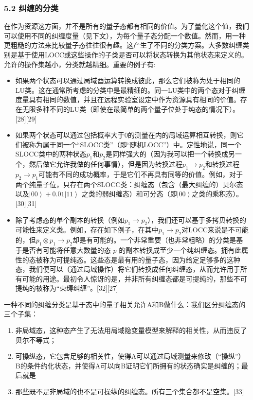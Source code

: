\subsubsection{5.2 纠缠的分类}
在作为资源这方面，并不是所有的量子态都有相同的价值。为了量化这个值，我们可以使用不同的纠缠度量（见下文），为每个量子态分配一个数值。然而，用一种更粗糙的方法来比较量子态往往很有趣。这产生了不同的分类方案。大多数纠缠类别是基于使用LOCC或这些操作的子类是否可以将状态转换为其他状态来定义的。允许的操作集越小，分类就越精细。重要的例子有:
\begin{itemize}
\item 如果两个状态可以通过局域酉运算转换成彼此，那么它们被称为处于相同的LU类。这在通常所考虑的分类中是最精细的。同一LU类中的两个态对于纠缠度量具有相同的数值，并且在远程实验室设定中作为资源具有相同的价值。存在无限多种不同的LU类（即使在最简单的两个量子位处于纯态的情况下）。[28][29]
\item 如果两个状态可以通过包括概率大于0的测量在内的局域运算相互转换，则它们被称为属于同一个“SLOCC类”（即“随机LOCC”）中。定性地说，同一个SLOCC类中的两种状态$p_{1}$和$p_{2}$是同样强大的（因为我可以把一个转换成另一个，然后做它允许我做的任何事情），但是因为转换过程$p_{1}\to p_{2}$和转换过程$p_{2}\to p_{1}$可能有不同的成功概率，于是它们不再具有同等的价值。例如，对于两个纯量子位，只存在两个SLOCC类：纠缠态（包含（最大纠缠的）贝尔态以及$\left|00\right\rangle + 0.01\left|11\right\rangle
 $ 之类的弱纠缠态）和可分态（即$\left|00\right\rangle$之类的乘积态）。[30][31]
\item 除了考虑态的单个副本的转换（例如$p_{1}\to p_{2}$），我们还可以基于多拷贝转换的可能性来定义类。例如，存在如下例子，在其中$p_{1}\to p_{2}$对LOCC来说是不可能的，但$p_{1}\otimes p_{1}\to p_{2}$却是有可能的。一个非常重要（也非常粗略）的分类是基于是否有可能将任意大数量的态 $p$ 的副本转换成至少一个纯纠缠态。拥有此属性的态被称为可提纯态。这些态是最有用的量子态，因为给定足够多的这种态，我们便可以（通过局域操作）将它们转换成任何纠缠态，从而允许用于所有可能的用途。最初令人惊讶的是，并非所有纠缠态都是可提纯的，那些不可提纯的被称为“束缚纠缠”。[32][27]
\end{itemize}

一种不同的纠缠分类是基于态中的量子相关允许A和B做什么：我们区分纠缠态的三个子集：
\begin{enumerate}
\item 非局域态，这种态产生了无法用局域隐变量模型来解释的相关性，从而违反了贝尔不等式；

\item 可操纵态，它包含足够的相关性，使得A可以通过局域测量来修改（“操纵”）B的条件约化状态，并使得A可以向B证明它们所拥有的状态确实是纠缠的；最后就是

\item 那些既不是非局域的也不是可操纵的纠缠态。所有三个集合都不是空集。[33]
\end{enumerate}


